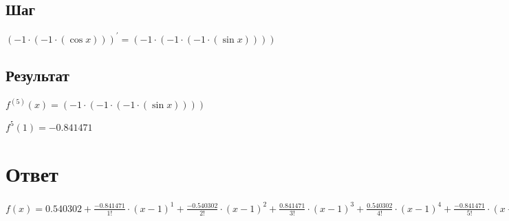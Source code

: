 \documentclass[12pt, letterpaper]{report}
\begin{document}
\subsection{Шаг}
\begin{center} $({-1}\cdot{({-1}\cdot{(\cos{x})})})^{\prime} = ({-1}\cdot{({-1}\cdot{({-1}\cdot{(\sin{x})})})})$ \end{center} 

\subsection{Результат}
\begin{center} $f^{(5)}(x) = ({-1}\cdot{({-1}\cdot{({-1}\cdot{(\sin{x})})})})$ \end{center} 
\begin{center} $f^{5}(1) = -0.841471$ \end{center}
\section{Ответ}
\begin{center} $f(x) = 0.540302 + \frac{-0.841471}{1!}\cdot(x - 1)^{1} + \frac{-0.540302}{2!}\cdot(x - 1)^{2} + \frac{0.841471}{3!}\cdot(x - 1)^{3} + \frac{0.540302}{4!}\cdot(x - 1)^{4} + \frac{-0.841471}{5!}\cdot(x - 1)^{5} + o((x - 1)^{5})$ \end{center}
\end{document}

